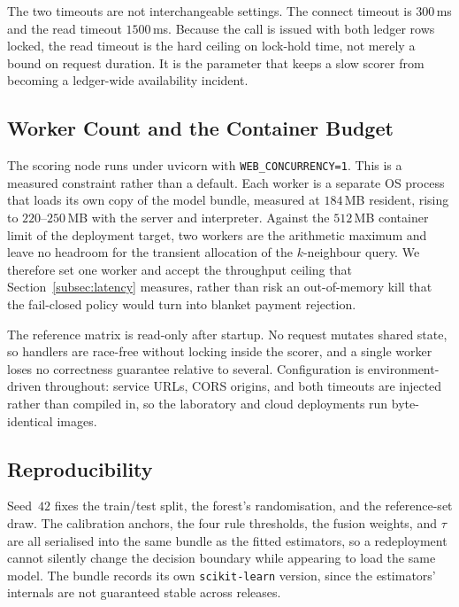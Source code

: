 \documentclass[conference]{IEEEtran}
\begin{document}
The two timeouts are not interchangeable settings. The connect timeout
is $300$\,ms and the read timeout $1500$\,ms. Because the call is
issued with both ledger rows locked, the read timeout is the hard
ceiling on lock-hold time, not merely a bound on request duration. It
is the parameter that keeps a slow scorer from becoming a ledger-wide
availability incident.

\subsection{Worker Count and the Container Budget}

The scoring node runs under uvicorn with \texttt{WEB\_CONCURRENCY=1}.
This is a measured constraint rather than a default. Each worker is a
separate OS process that loads its own copy of the model bundle,
measured at $184$\,MB resident, rising to $220$--$250$\,MB with the
server and interpreter. Against the $512$\,MB container limit of the
deployment target, two workers are the arithmetic maximum and leave no
headroom for the transient allocation of the $k$-neighbour query. We
therefore set one worker and accept the throughput ceiling that
Section~\ref{subsec:latency} measures, rather than risk an
out-of-memory kill that the fail-closed policy would turn into blanket
payment rejection.

The reference matrix is read-only after startup. No request mutates
shared state, so handlers are race-free without locking inside the
scorer, and a single worker loses no correctness guarantee relative to
several. Configuration is environment-driven throughout: service URLs,
CORS origins, and both timeouts are injected rather than compiled in,
so the laboratory and cloud deployments run byte-identical images.

\subsection{Reproducibility}

Seed~$42$ fixes the train/test split, the forest's randomisation, and
the reference-set draw. The calibration anchors, the four rule
thresholds, the fusion weights, and $\tau$ are all serialised into the
same bundle as the fitted estimators, so a redeployment cannot silently
change the decision boundary while appearing to load the same model.
The bundle records its own \texttt{scikit-learn} version, since the
estimators' internals are not guaranteed stable across releases.

\end{document}
